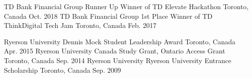 \begin{cvhonors}
  \cvhonor
    {TD Bank Financial Group}
    {Runner Up Winner of TD Elevate Hackathon}
    {Toronto, Canada}
    {Oct. 2018}
  \cvhonor
    {TD Bank Financial Group}
    {1st Place Winner of TD ThinkDigital Tech Jam}
    {Toronto, Canada}
    {Feb. 2017}
\end{cvhonors}

\begin{cvhonors}
  \cvhonor
    {Ryerson University}
    {Dennis Mock Student Leadership Award}
    {Toronto, Canada}
    {Apr. 2015}
  \cvhonor
    {Ryerson University}
    {Canada Study Grant, Ontario Access Grant}
    {Toronto, Canada}
    {Sep. 2014}
  \cvhonor
    {Ryerson University}
    {Ryerson University Entrance Scholarship}
    {Toronto, Canada}
    {Sep. 2009}
\end{cvhonors}
\vspace{45mm}

